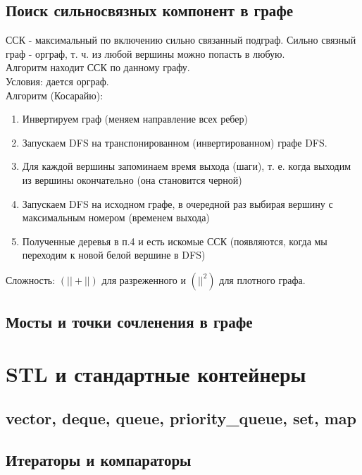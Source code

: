 \documentclass[a4paper]{article}
\begin{document}
\subsection{Поиск сильносвязных компонент в графе}
ССК - максимальный по включению сильно связанный подграф. Сильно связный граф - орграф, т. ч. из любой вершины можно попасть в любую.\\
Алгоритм находит ССК по данному графу.\\
Условия: дается орграф.\\
Алгоритм (Косарайю):
\begin{enumerate}
	\item Инвертируем граф (меняем направление всех ребер)
	\item Запускаем DFS на транспонированном (инвертированном) графе DFS.
	\item Для каждой вершины запоминаем время выхода (шаги), т. е. когда выходим из вершины окончательно (она становится черной)
	\item Запускаем DFS на исходном графе, в очередной раз выбирая вершину с максимальным номером (временем выхода)
	\item Полученные деревья в п.4 и есть искомые ССК (появляются, когда мы переходим к новой белой вершине в DFS)
\end{enumerate}
Сложность: $(|| + ||)$ для разреженного и $(||^2)$ для плотного графа. 
\subsection{Мосты и точки сочленения в графе}

\section{STL и стандартные контейнеры}
\subsection{vector, deque, queue, priority\_queue, set, map}
\subsection{Итераторы и компараторы}
\end{document}
